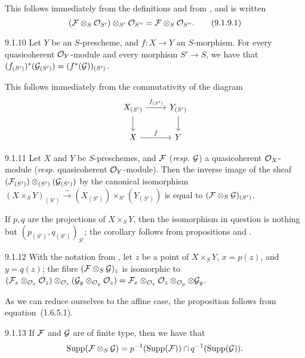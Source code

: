 This follows immediately from the definitions and from , and is
written
\[
  (\mathcal{F}\otimes_S\mathcal{O}_{S'})\otimes_{S'}\mathcal{O}_{S''}=\mathcal{F}\otimes_S\mathcal{O}_{S''}.\tag{9.1.9.1}
\]

\begin{env}[Proposition]{9.1.10}
Let $Y$ be an $S$-prescheme, and $f\colon X\to
Y$ an $S$-morphism. For every quasicoherent $\mathcal{O}_Y$-module and every morphism
$S'\to S$, we have that
$(f_{(S')})^\ast(\mathcal{G}_{(S')})=(f^\ast(\mathcal{G}))_{(S')}$.
\end{env}

This follows immediately from the commutativity of the diagram 
\[
  \begin{tikzcd}
    X_{(S')}\ar{r}{f_{(S')}}\ar{d} & Y_{(S')}\ar{d}\\
    X\ar{r}{f} & Y
  \end{tikzcd}
\]

\begin{env}[Corollary]{9.1.11}
Let $X$ and $Y$ be $S$-preschemes, and
$\mathcal{F}$ (\emph{resp.} $\mathcal{G}$) a quasicoherent $\mathcal{O}_X$-module
(\emph{resp.} quasicoherent $\mathcal{O}_Y$-module). Then the inverse image of the sheaf
$(\mathcal{F}_{(S')})\otimes_{(S')}(\mathcal{G}_{(S')})$ by the canonical isomorphism
$(X\times_S Y)_{(S')}\xrightarrow{\sim}(X_{(S')})\times_{S'}(Y_{(S')})$
 is equal to $(\mathcal{F}\otimes_S\mathcal{G})_{(S')}$.
\end{env}

If $p,q$ are the projections of $X\times_S Y$, then the isomorphism in question
is nothing but $(p_{(S')}, q_{(S')})_{S'}$; the corollary follows from
propositions  and .

\begin{env}[Proposition]{9.1.12}
With the notation from , let $z$ be
a point of $X\times_S Y$, $x=p(z)$, and $y=q(z)$; the fibre
$(\mathcal{F}\otimes_S\mathcal{G})_z$ is isomorphic to
$(\mathcal{F}_x\otimes_{\mathcal{O}_x}\mathcal{O}_z)\otimes_{\mathcal{O}_z}(\mathcal{G}_y\otimes_{\mathcal{O}_y}\mathcal{O}_z)
=\mathcal{F}_x\otimes_{\mathcal{O}_x}\mathcal{O}_z\otimes_{\mathcal{O}_y}\otimes\mathcal{G}_y$.
\end{env}

As we can reduce ourselves to the affine case, the proposition follows from
equation~(1.6.5.1).

\begin{env}[Corollary]{9.1.13}
If $\mathcal{F}$ and $\mathcal{G}$ are of finite
type, then we have that
\[
  \operatorname{Supp}(\mathcal{F}\otimes_S\mathcal{G})
  =p^{-1}(\operatorname{Supp}(\mathcal{F}))\cap q^{-1}(\operatorname{Supp}(\mathcal{G})).
\]
\end{env}

